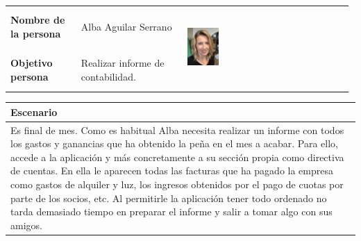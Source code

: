 \documentclass[11pt]{article}
\begin{document}
\begin{table}[H]
	\centering
	\begin{tabular}{p{0.2\linewidth}|p{0.3\linewidth}p{0.475\linewidth}}
		\toprule
		\textbf{Nombre de la persona} & Alba Aguilar Serrano &\multirow{2}{*}{\begin{minipage}{1.\textwidth}\includegraphics[width=0.2\textwidth, height=30mm]{Alba}\end{minipage}}\\
		\textbf{Objetivo persona} & Realizar informe de contabilidad. \\
		\bottomrule
	\end{tabular}
	
	\begin{tabular}{p{1.028\linewidth}}
		\textbf{Escenario}\\
		\midrule
		Es final de mes. Como es habitual Alba necesita realizar un informe con todos los gastos y ganancias que ha obtenido la peña en el mes a acabar. Para ello, accede a la aplicación y más concretamente a su sección propia como directiva de cuentas. En ella le aparecen todas las facturas que ha pagado la empresa como gastos de alquiler y luz, los ingresos obtenidos por el pago de cuotas por parte de los socios, etc. Al permitirle la aplicación tener todo ordenado no tarda demasiado tiempo en preparar el informe y salir a tomar algo con sus amigos.
	\end{tabular}
\end{table}
\end{document}
